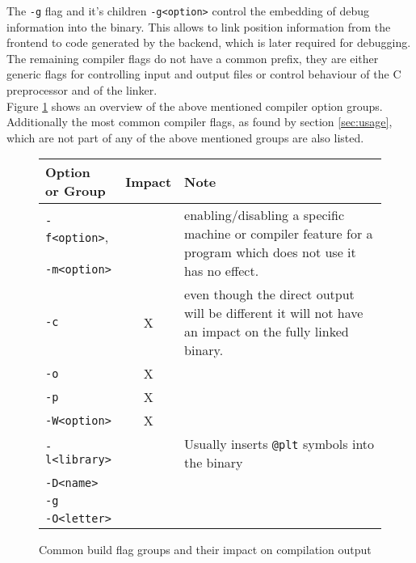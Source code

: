 \documentclass[9pt, a4paper, twocolumn]{article}
\begin{document}
The \verb'-g' flag and it's children \verb'-g<option>' control the embedding of debug information into the binary. This allows to link position information from the frontend to code generated by the backend, which is later required for debugging. \\
The remaining compiler flags do not have a common prefix, they are either generic flags for controlling input and output files or control behaviour of the C preprocessor and of the linker\cite{gcc-man, clang-man}. \\
Figure \ref{fig:gcc-options} shows an overview of the above mentioned compiler option groups. Additionally the most common compiler flags, as found by section \ref{sec:usage}, which are not part of any of the above mentioned groups are also listed.

\begin{figure}[H] %
	\centering
	\begin{tabular}{l | c | p{}}
		\makecell[l]{Option \\ or Group} & Impact & Note \\
		\hline
		\verb'-f<option>', & \checkmark & \multirow{2}{.25\textwidth}{enabling/disabling a specific machine or compiler feature for a program which does not use it has no effect.} \\
		\verb'-m<option>' & \checkmark & \vspace{2em}~ \\
		\verb'-c' & X & even though the direct output will be different it will not have an impact on the fully linked binary. \\
		\verb'-o' & X & \\
		\verb'-p' & X & \\
		\verb'-W<option>' & X & \\
		\verb'-l<library>' & \checkmark & Usually inserts \verb'@plt' symbols into the binary \\
		\verb'-D<name>' & \checkmark \\
		\verb'-g' & \checkmark \\
		\verb'-O<letter>' & \checkmark \\
	\end{tabular}
	\caption{Common build flag groups and their impact on compilation output}
	\label{fig:gcc-options}
\end{figure}
\end{document}
